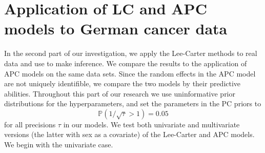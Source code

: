 \newpage
\section{Application of LC and APC models to German cancer data}
\label{sec:real-data}
In the second part of our investigation, we apply the Lee-Carter methods to real data and use \inlabru to make inference. We compare the results to the application of APC models on the same data sets. Since the random effects in the APC model are not uniquely identifible, we compare the two models by their predictive abilities. Throughout this part of our research we use uninformative prior distributions for the hyperparameters, and set the parameters in the PC priors to
\begin{equation*}
    \mathbb{P}(1/\sqrt{\tau} > 1) = 0.05
\end{equation*}
for all precisions $\tau$ in our models. We test both univariate and multivariate versions (the latter with sex as a covariate) of the Lee-Carter and APC models. We begin with the univariate case. 

